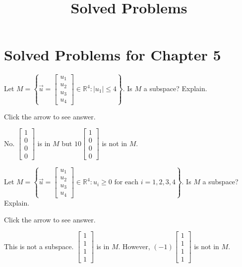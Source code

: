 \documentclass{ximera}
\title{Solved Problems} \license{CC BY-NC-SA 4.0}
\begin{document}
\begin{abstract}
\end{abstract}
\maketitle

\section*{Solved Problems for Chapter 5}

\begin{problem}\label{prb:5.10} Let $M=\left\{ \vec{u}=\left[ \begin{array}{c}
u_{1} \\
u_{2} \\
u_{3} \\
u_{4}
\end{array}\right] \in
\mathbb{R}^{4}:|u_{1}| \leq 4\right\} .$ Is $M$ a
subspace? Explain.

Click the arrow to see answer.  
\begin{expandable}{}{}
No. $\left[
\begin{array}{r}
1 \\
0 \\
0 \\
0
\end{array}
\right]$ is in $M$ but $10\left[ \begin{array}{r}
1 \\
0 \\
0 \\
0
\end{array}
\right]$ is not in $M$.
\end{expandable}
\end{problem}

\begin{problem}\label{prb:5.11} Let $M=\left\{ \vec{u}=\left[ \begin{array}{c}
u_{1} \\
u_{2} \\
u_{3} \\
u_{4}
\end{array}\right] \in
\mathbb{R}^{4}:u_{i}\geq 0\text{ for each }i=1,2,3,4\right\} .$ Is $M$ a
subspace? Explain.

Click the arrow to see answer.  
\begin{expandable}{}{}
This is not a subspace. $\left[ \begin{array}{r}
1 \\
1 \\
1 \\
1
\end{array}
\right] $
is in $M$. However, $\left( -1\right) \left[
\begin{array}{r}
1 \\
1 \\
1 \\
1
\end{array}
\right] $ is not in $M$.
\end{expandable}
\end{problem}
\end{document}
